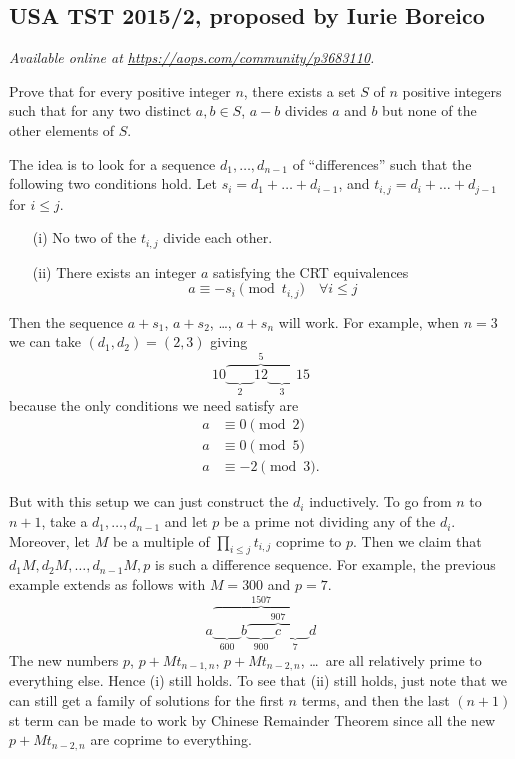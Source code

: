 \documentclass[11pt]{scrartcl}
\begin{document}
\subsection{USA TST 2015/2, proposed by Iurie Boreico}
\textsl{Available online at \url{https://aops.com/community/p3683110}.}
\begin{mdframed}[style=mdpurplebox,frametitle={Problem statement}]
Prove that for every positive integer $n$, there exists a set $S$ of $n$ positive integers
such that for any two distinct $a,b \in S$, $a-b$ divides $a$ and $b$
but none of the other elements of $S$.
\end{mdframed}
The idea is to look for a
sequence $d_1, \dots, d_{n-1}$ of ``differences''
such that the following two conditions hold.
Let $s_i = d_1 + \dots + d_{i-1}$,
and $t_{i,j} = d_i + \dots + d_{j-1}$ for $i \le j$.
\begin{enumerate}
\item[(i)] No two of the $t_{i,j}$ divide each other.
\item[(ii)] There exists an integer $a$
   satisfying the CRT equivalences
   \[ a \equiv -s_i \pmod{t_{i,j}} \quad \forall i \le j \]
\end{enumerate}
Then the sequence $a+s_1$, $a+s_2$, \dots, $a+s_n$ will work.
For example, when $n=3$ we can take $(d_1,d_2)=(2,3)$ giving
\[ 10 \overbrace{\underbrace{\qquad}_2 12 \underbrace{\qquad}_3}^5 15 \]
because the only conditions we need satisfy are
\begin{align*}
  a &\equiv 0 \pmod 2 \\
  a &\equiv 0 \pmod 5 \\
  a &\equiv -2 \pmod 3.
\end{align*}

But with this setup we can just construct the $d_i$ inductively.
To go from $n$ to $n+1$, take a $d_1, \dots, d_{n-1}$
and let $p$ be a prime
not dividing any of the $d_i$.
Moreover, let $M$ be a multiple of $\prod_{i \le j} t_{i,j}$ coprime to $p$.
Then we claim that $d_1M, d_2M, \dots, d_{n-1}M, p$
is such a difference sequence.
For example, the previous example extends as follows with $M = 300$ and $p=7$.
\[
   a \overbrace{\underbrace{\qquad}_{600} b
   \overbrace{\underbrace{\qquad}_{900} c
   \underbrace{\qquad}_{7}}^{907}}^{1507} d
\]
The new numbers $p$, $p+Mt_{n-1,n}$, $p+Mt_{n-2,n}$, \dots\
are all relatively prime to everything else.
Hence (i) still holds.
To see that (ii) still holds,
just note that we can still get a family of solutions
for the first $n$ terms, and then the last $(n+1)$st term
can be made to work by Chinese Remainder Theorem
since all the new $p+Mt_{n-2,n}$ are coprime to everything.
\pagebreak
\end{document}
